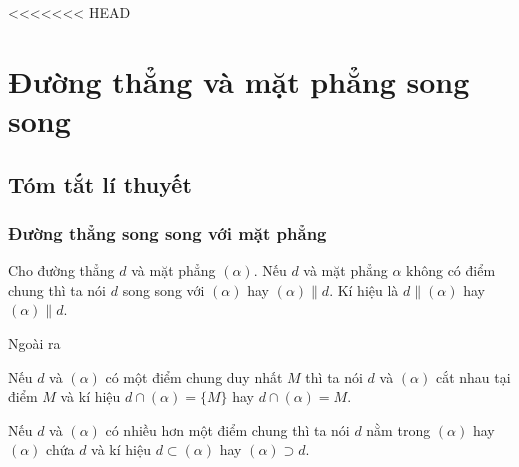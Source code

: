 <<<<<<< HEAD
\section{Đường thẳng và mặt phẳng song song}
\subsection{Tóm tắt lí thuyết}
\subsubsection{Đường thẳng song song với mặt phẳng}

\begin{dn}
    Cho đường thẳng $d$ và mặt phẳng $(\alpha)$. Nếu $d$ và mặt phẳng $\alpha$ không có điểm chung thì ta nói $d$ song song với $(\alpha)$ hay $(\alpha) \parallel d$. Kí hiệu là $d \parallel (\alpha)$ hay $(\alpha)\parallel d$.
\end{dn}
Ngoài ra
\begin{listEX}[1]
    \item  Nếu $d$ và $(\alpha)$ có một điểm chung duy nhất $M$ thì ta nói $d$ và $(\alpha)$ cắt nhau tại điểm $M$ và kí hiệu $d \cap(\alpha)=\{M\}$ hay $d \cap(\alpha)=M$.
    \item Nếu $d$ và $(\alpha)$ có nhiều hơn một điểm chung thì ta nói $d$ nằm trong $(\alpha)$ hay $(\alpha)$ chứa $d$ và kí hiệu $d \subset(\alpha)$ hay $(\alpha) \supset d$.
\end{listEX}
